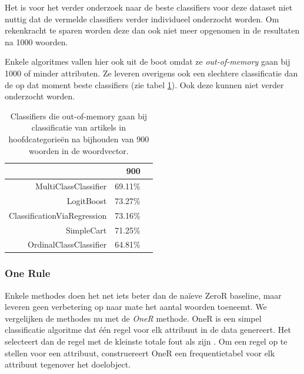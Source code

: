 Het is voor het verder onderzoek naar de beste classifiers voor deze dataset niet nuttig dat de vermelde classifiers verder individueel onderzocht worden. Om rekenkracht te sparen worden deze dan ook niet meer opgenomen in de resultaten na 1000 woorden.

Enkele algoritmes vallen hier ook uit de boot omdat ze \textit{out-of-memory} gaan bij 1000 of minder attributen. Ze leveren overigens ook een slechtere classificatie dan de op dat moment beste classifiers (zie tabel \ref{tab:out-of-memory}). Ook deze kunnen niet verder onderzocht worden.

\begin{table}[htbp]
	\centering
	\caption{Classifiers die out-of-memory gaan bij classificatie van artikels in hoofdcategorie\"en na bijhouden van 900 woorden in de woordvector.}
	\begin{tabular}{rrr}
		\toprule
		& 900 \\
		\midrule
		MultiClassClassifier & \multicolumn{1}{c}{69.11\%} \\
		LogitBoost & \multicolumn{1}{c}{73.27\%} \\
		ClassificationViaRegression & \multicolumn{1}{c}{73.16\%} \\
		SimpleCart & \multicolumn{1}{c}{71.25\%} \\
		OrdinalClassClassifier  & \multicolumn{1}{c}{64.81\%} \\
		\bottomrule
	\end{tabular}%
	\label{tab:out-of-memory}%
\end{table}


\subsubsection{One Rule}
Enkele methodes doen het net iets beter dan de na\"ieve ZeroR baseline, maar leveren geen verbetering op naar mate het aantal woorden toeneemt. We vergelijken de methodes nu met de \textit{OneR} methode. OneR is een simpel classificatie algoritme dat \'e\'en regel voor elk attribuut in de data genereert. Het selecteert dan de regel met de kleinste totale fout als zijn . Om een regel op te stellen voor een attribuut, construereert OneR een frequentietabel voor elk attribuut tegenover het doelobject.


